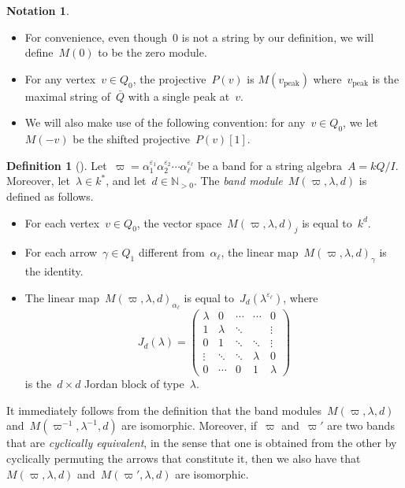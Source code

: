 \documentclass{memo-l}
\theoremstyle{definition}
\newtheorem{definition}[theorem]{Definition}
\newtheorem{notation}[theorem]{Notation}
\newcommand{\N}{\mathbb{N}} %
\newcommand{\darkblue}{\color{darkblue}} %
\newcommand{\defn}[1]{\textsl{\darkblue #1}} %
\newcommand{\peak}{\mathrm{peak}} %
\begin{document}
\begin{notation}
 \begin{itemize}
  \item For convenience, even though~$0$ is not a string by our definition, we will define~$M(0)$ to be the zero module.
  \item For any vertex~$v \in Q_0$, the projective~$P(v)$ is $M(v_\peak)$ where~$v_\peak$ is the maximal string of~$\bar Q$ with a single peak at~$v$.
  \item We will also make use of the following convention: for any~$v\in Q_0$, we let~$M(-v)$ be the shifted projective~$P(v)[1]$.
 \end{itemize}
\end{notation}

\begin{definition}[\cite{ButlerRingel}]
Let~$\varpi = \alpha_1^{\varepsilon_1}\alpha_2^{\varepsilon_2}\cdots \alpha_\ell^{\varepsilon_\ell}$ be a band for a string algebra~$A=kQ/I$.
Moreover, let~$\lambda\in k^*$, and let~$d \in \N_{>0}$.
The \defn{band module}~$M(\varpi, \lambda, d)$ is defined as follows.
  \begin{itemize}
    \item For each vertex~$v \in Q_0$, the vector space~$M(\varpi, \lambda, d)_j$ is equal to~$k^d$.
    \item For each arrow~$\gamma \in Q_1$ different from~$\alpha_\ell$, the linear map~$M(\varpi, \lambda, d)_\gamma$ is the identity.
    \item The linear map~$M(\varpi, \lambda, d)_{\alpha_\ell}$ is equal to~$J_d(\lambda^{\varepsilon_\ell})$, where
     \[
        J_d(\lambda) =
        \begin{pmatrix} 
        \lambda & 0 & \cdots & \cdots & 0 \\
        1 & \lambda & \ddots & & \vdots \\
        0 & 1 & \ddots & \ddots & \vdots \\
        \vdots & \ddots & \ddots & \lambda & 0 \\
        0 & \cdots & 0 & 1 & \lambda                                        
        \end{pmatrix}
     \]
    is the~$d\times d$ Jordan block of type~$\lambda$.
  \end{itemize}
\end{definition}

It immediately follows from the definition that the band modules~$M(\varpi, \lambda, d)$ and~$M(\varpi^{-1}, \lambda^{-1}, d)$ are isomorphic.  Moreover, if~$\varpi$ and~$\varpi'$ are two bands that are \defn{cyclically equivalent}, in the sense that one is obtained from the other by cyclically permuting the arrows that constitute it, then we also have that~$M(\varpi, \lambda, d)$ and~$M(\varpi', \lambda, d)$ are isomorphic.
\end{document}
